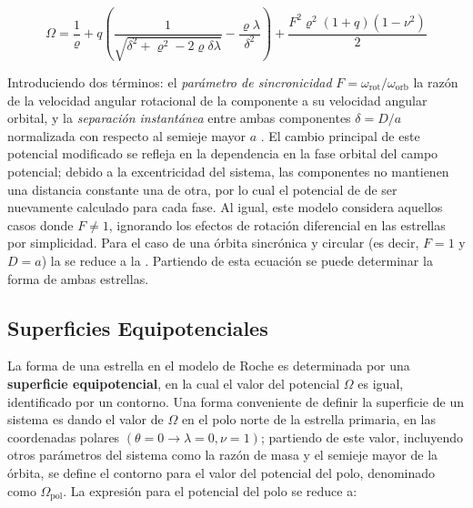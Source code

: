 \begin{eqfloat}[!ht]
	\centering
	\begin{equation}
		\Omega = \frac{1}{\varrho} + q \left(\frac{1}{\sqrt{\delta^2 + \varrho^2 - 2\varrho \delta \lambda}} - \frac{\varrho \lambda}{\delta^2} \right) + \frac{F^2 \varrho^2 (1 + q)(1 - \nu^2)}{2}
	\end{equation}
	\blankcaption
	\label{ecuacionRocheExcentricaAsincronica}
\end{eqfloat}

Introduciendo dos términos: el \textit{parámetro de sincronicidad} $F =
\omega_{\mathrm{rot}} / \omega_{\mathrm{orb}}$ la razón de la velocidad angular rotacional de la
componente a su velocidad angular orbital, y la \textit{separación instantánea}
entre ambas componentes $\delta = D / a$ normalizada con respecto al semieje
mayor $a$ . El cambio principal
de este potencial modificado se refleja en la dependencia en la fase orbital del
campo potencial; debido a la excentricidad del sistema, las componentes no
mantienen una distancia constante una de otra, por lo cual el potencial de de
ser nuevamente calculado para cada fase. Al igual, este modelo considera
aquellos casos donde $F \neq 1$, ignorando los efectos de rotación diferencial
en las estrellas por simplicidad. Para el caso de una órbita sincrónica y
circular (es decir, $F = 1$ y $D = a$) la
 se reduce a la
. Partiendo de esta ecuación se puede determinar la
forma de ambas estrellas.

\subsection{Superficies Equipotenciales}

La forma de una estrella en el modelo de Roche es determinada por una
\textbf{superficie equipotencial}, en la cual el valor del potencial $\Omega$ es
igual, identificado por un contorno. Una forma conveniente de definir la
superficie de un sistema es dando el valor de $\Omega$ en el polo norte de la
estrella primaria, en las coordenadas polares $(\theta = 0 \rightarrow \lambda = 0,\nu =
1)$; partiendo de este valor, incluyendo otros parámetros del sistema como la
razón de masa y el semieje mayor de la órbita, se define el contorno para el
valor del potencial del polo, denominado como $\Omega_{\mathrm{pol}}$. La
expresión para el potencial del polo se reduce a:

